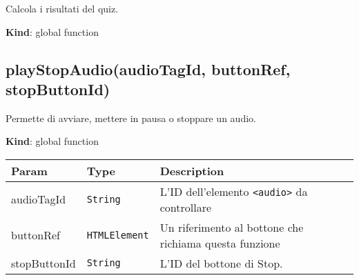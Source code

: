 Calcola i risultati del quiz.

\textbf{Kind}: global function\\
\protect\hypertarget{playStopAudio}{}{}

\hypertarget{playstopaudioaudiotagid-buttonref-stopbuttonid}{%
\subsection{playStopAudio(audioTagId, buttonRef,
stopButtonId)}\label{playstopaudioaudiotagid-buttonref-stopbuttonid}}

Permette di avviare, mettere in pausa o stoppare un audio.

\textbf{Kind}: global function

\begin{tabularx}{\textwidth}{XXX}
\toprule
\begin{minipage}[b]{0.30\columnwidth}\raggedright
Param\strut
\end{minipage} & \begin{minipage}[b]{0.30\columnwidth}\raggedright
Type\strut
\end{minipage} & \begin{minipage}[b]{0.30\columnwidth}\raggedright
Description\strut
\end{minipage}\tabularnewline
\midrule
\endhead
\begin{minipage}[t]{0.30\columnwidth}\raggedright
audioTagId\strut
\end{minipage} & \begin{minipage}[t]{0.30\columnwidth}\raggedright
\texttt{String}\strut
\end{minipage} & \begin{minipage}[t]{0.30\columnwidth}\raggedright
L'ID dell'elemento \texttt{\textless{}audio\textgreater{}} da
controllare\strut
\end{minipage}\tabularnewline
\begin{minipage}[t]{0.30\columnwidth}\raggedright
buttonRef\strut
\end{minipage} & \begin{minipage}[t]{0.30\columnwidth}\raggedright
\texttt{HTMLElement}\strut
\end{minipage} & \begin{minipage}[t]{0.30\columnwidth}\raggedright
Un riferimento al bottone che richiama questa funzione\strut
\end{minipage}\tabularnewline
\begin{minipage}[t]{0.30\columnwidth}\raggedright
stopButtonId\strut
\end{minipage} & \begin{minipage}[t]{0.30\columnwidth}\raggedright
\texttt{String}\strut
\end{minipage} & \begin{minipage}[t]{0.30\columnwidth}\raggedright
L'ID del bottone di Stop.\strut
\end{minipage}\tabularnewline
\bottomrule
\end{tabularx}

